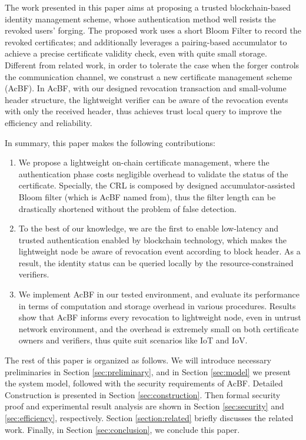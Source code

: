 \documentclass[conference]{IEEEtran}
\begin{document}
The work presented in this paper aims at proposing a trusted blockchain-based identity management scheme, whose authentication method well resists the revoked users' forging. The proposed work uses a short Bloom Filter to record the revoked certificates; and additionally leverages a pairing-based accumulator to achieve a precise certificate validity check, even with quite small storage. Different from related work, in order to tolerate the case when the forger controls the communication channel, we construst a new certificate management scheme (AcBF). In AcBF, with our designed revocation transaction and small-volume header structure, the lightweight verifier can be aware of the revocation events with only the received header, thus achieves trust local query to improve the efficiency and reliability. 

In summary, this paper makes the following contributions:
\begin{enumerate}
	\item We propose a lightweight on-chain certificate management, where the authentication phase costs negligible overhead to validate the status of the certificate. Specially, the CRL is composed by designed accumulator-assisted Bloom filter (which is AcBF named from), thus the filter length can be drastically shortened without the problem of false detection. 
	\item To the best of our knowledge, we are the first to enable low-latency and trusted authentication enabled by blockchain technology, which makes the lightweight node be aware of revocation event according to block header. As a result, the identity status can be queried locally by the resource-constrained verifiers.
	\item We implement AcBF in our tested environment, and evaluate its performance in terms of computation and storage overhead in various procedures. Results show that AcBF informs every revocation to lightweight node, even in untrust network environment, and the overhead is extremely small on both certificate owners and verifiers, thus quite suit scenarios like IoT and IoV.
\end{enumerate}

The rest of this paper is organized as follows. We will
introduce necessary preliminaries in Section \ref{sec:preliminary}, and in Section \ref{sec:model} we present the system model, followed with the security requirements of AcBF. Detailed Construction is presented in Section \ref{sec:construction}. Then formal security proof and experimental result analysis are shown in Section \ref{sec:security} and \ref{sec:efficiency}, respectively. Section \ref{section:related} briefly discusses the related work. Finally, in Section \ref{sec:conclusion}, we conclude this paper. 
\end{document}
